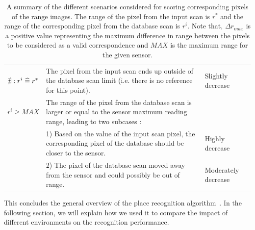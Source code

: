 \begin{table}
\begin{tabular}{@{}p{}p{}p{}@{}}
        $\nexists : r^i \mathrel{\widehat{=}} r^*$ & The pixel from the input scan ends up outside of the database scan limit (i.e. there is no reference for this point).   & Slightly decrease \\
        $r^i \ge MAX$                    & The range of the pixel from the database scan is larger or equal to the sensor maximum reading range, leading to two subcases : & \\
                                         & 1) Based on the value of the input scan pixel, the corresponding pixel of the database should be closer to the sensor.  & Highly decrease \\
                                         & 2) The pixel of the database scan moved away from the sensor and could possibly be out of range.                        & Moderately decrease \\
        \bottomrule
    \end{tabular}
    \caption[A summary of the different scenarios for scoring corresponding pixels of the range images.]{A summary of the different scenarios considered for scoring corresponding pixels of the range images. The range of the pixel from the input scan is $r^*$ and the range of the corresponding pixel from the database scan is $r^i$. Note that, $\Delta r_{max}$ is a positive value representing the maximum difference in range between the pixels to be considered as a valid correspondence and $MAX$ is the maximum range for the given sensor.}
    \label{tab:chap_slam_scoring_scenarios}
\end{table}

This concludes the general overview of the place recognition algorithm~\citep{Steder2011b}. In the following section, we will explain how we used it to compare the impact of different environments on the recognition performance.

\FloatBarrier
